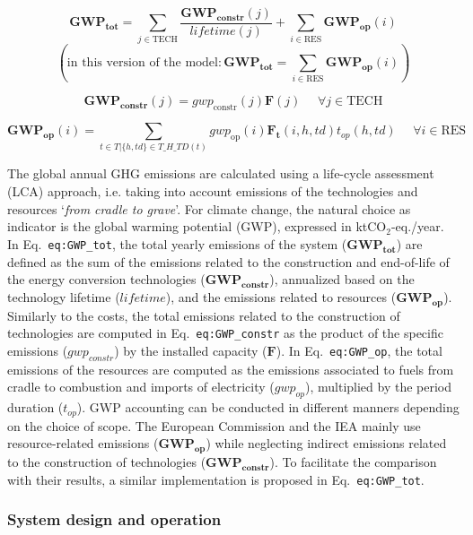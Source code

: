 \documentclass[
]{article}
\begin{document}
{\[\textbf{GWP}_\textbf{tot}  = \sum_{j \in \text{TECH}} \frac{\textbf{GWP}_\textbf{constr} (j)}{lifetime(j)} +   \sum_{i \in \text{RES}} \textbf{GWP}_\textbf{op} (i)\]\[\left(\text{in this version of the model} :   \textbf{GWP}_\textbf{tot}  =    \sum_{i \in \text{RES}} \textbf{GWP}_\textbf{op} (i) \right)\]}

{\[\textbf{GWP}_\textbf{constr}(j) = gwp_{\text{constr}}(j) \textbf{F}(j) ~~~~~~ \forall j \in \text{TECH}\]}

{\[\textbf{GWP}_\textbf{op}(i) = \sum_{t \in T| \{h,td\} \in T\_H\_TD(t)} gwp_\text{op}(i) \textbf{F}_\textbf{t}(i,h,td)  t_{op} (h,td )~~~~~~ \forall i \in \text{RES}\]}

The global annual GHG emissions are calculated using a life-cycle
assessment (LCA) approach, i.e. taking into account emissions of the
technologies and resources `\emph{from cradle to grave}'. For climate
change, the natural choice as indicator is the global warming potential
(GWP), expressed in ktCO\(_2\)-eq./year. In Eq.~\texttt{eq:GWP\_tot},
the total yearly emissions of the system
(\(\textbf{GWP}_{\textbf{tot}}\)) are defined as the sum of the
emissions related to the construction and end-of-life of the energy
conversion technologies (\(\textbf{GWP}_{\textbf{constr}}\)), annualized
based on the technology lifetime (\(lifetime\)), and the emissions
related to resources (\(\textbf{GWP}_{\textbf{op}}\)). Similarly to the
costs, the total emissions related to the construction of technologies
are computed in Eq.~\texttt{eq:GWP\_constr} as the product of the
specific emissions (\(gwp_{constr}\)) by the installed capacity
(\(\textbf{F}\)). In Eq.~\texttt{eq:GWP\_op}, the total emissions of the
resources are computed as the emissions associated to fuels from cradle
to combustion and imports of electricity (\(gwp_{op}\)), multiplied by
the period duration (\(t_{op}\)). GWP accounting can be conducted in
different manners depending on the choice of scope. The European
Commission and the IEA mainly use resource-related emissions
(\(\textbf{GWP}_{\textbf{op}}\)) while neglecting indirect emissions
related to the construction of technologies
(\(\textbf{GWP}_{\textbf{constr}}\)). To facilitate the comparison with
their results, a similar implementation is proposed in
Eq.~\texttt{eq:GWP\_tot}.

\subsubsection{System design and
operation}\label{app:sec:system_design_and_operation}
\end{document}
